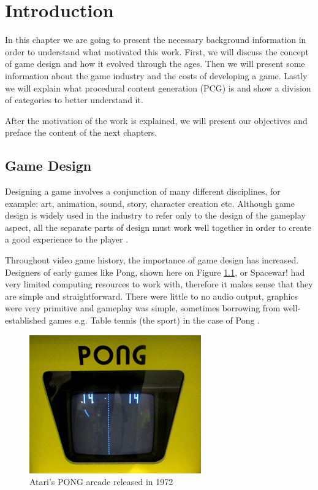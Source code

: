 \chapter{Introduction} %
In this chapter we are going to present the necessary background information in order to understand what motivated this work. First, we will discuss the concept of game design and how it evolved through the ages. Then we will present some information about the game industry and the costs of developing a game. Lastly we will explain what procedural content generation (PCG) is and show a division of categories to better understand it.

After the motivation of the work is explained, we will present our objectives and preface the content of the next chapters. 

\section{Game Design}

Designing a game involves a conjunction of many different disciplines, for example: art, animation, sound, story, character creation etc. Although game design is widely used in the industry to refer only to the design of the gameplay aspect, all the separate parts of design must work well together in order to create a good experience to the player \cite{zubek:2020}.

Throughout video game history, the importance of game design has increased. Designers of early games like Pong, shown here on Figure \ref{fig:pong}, or Spacewar! had very limited computing resources to work with, therefore it makes sense that they are simple and straightforward. There were little to no audio output, graphics were very primitive and gameplay was simple, sometimes borrowing from well-established games e.g. Table tennis (the sport) in the case of Pong \cite{wolf:2007}.

\begin{figure}[h]
    \caption{Atari's PONG arcade released in 1972}
    \centerline{\includegraphics{images/introduction/PongScreenAtariOriginal.jpeg}}
    \label{fig:pong}
\end{figure}

